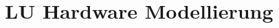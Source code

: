 \documentclass[a4paper,12pt]{scrreprt}
\title{}
\author{Nick Mayerhofer}
\author{Lukas Petermann}
\begin{document}
\maketitle
\tableofcontents

\renewcommand{\thesection}{\arabic{section}}

\chapter{LU Hardware Modellierung}










\end{document}
